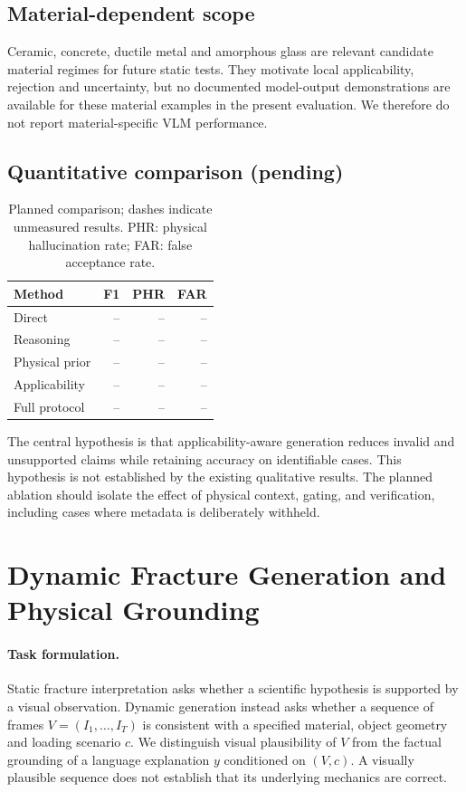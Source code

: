 \documentclass[11pt]{article}
\begin{document}
\subsection{Material-dependent scope}
Ceramic, concrete, ductile metal and amorphous glass are relevant candidate material regimes for future static tests. They motivate local applicability, rejection and uncertainty, but no documented model-output demonstrations are available for these material examples in the present evaluation. We therefore do not report material-specific VLM performance.
\subsection{Quantitative comparison (pending)}
\begin{table}[t]\small\centering
\begin{tabular}{lrrr}\toprule
Method & F1 & PHR & FAR\\\midrule
Direct & -- & -- & --\\
Reasoning & -- & -- & --\\
Physical prior & -- & -- & --\\
Applicability & -- & -- & --\\
Full protocol & -- & -- & --\\\bottomrule\end{tabular}
\caption{Planned comparison; dashes indicate unmeasured results. PHR: physical hallucination rate; FAR: false acceptance rate.}\end{table}
The central hypothesis is that applicability-aware generation reduces invalid and unsupported claims while retaining accuracy on identifiable cases. This hypothesis is not established by the existing qualitative results. The planned ablation should isolate the effect of physical context, gating, and verification, including cases where metadata is deliberately withheld.

\section{Dynamic Fracture Generation and Physical Grounding}
\label{sec:dynamic}
\paragraph{Task formulation.} Static fracture interpretation asks whether a scientific hypothesis is supported by a visual observation. Dynamic generation instead asks whether a sequence of frames $V=(I_1,\ldots,I_T)$ is consistent with a specified material, object geometry and loading scenario $c$. We distinguish visual plausibility of $V$ from the factual grounding of a language explanation $y$ conditioned on $(V,c)$. A visually plausible sequence does not establish that its underlying mechanics are correct.
\end{document}
